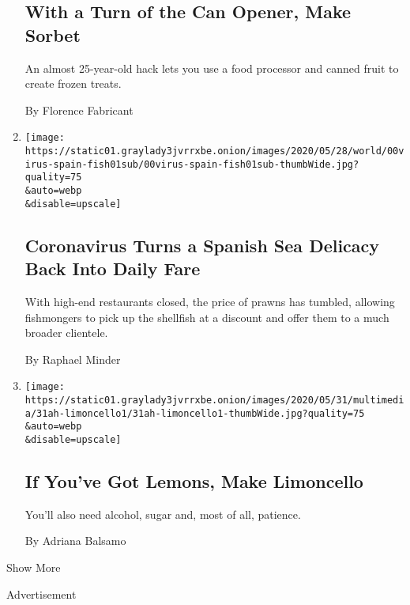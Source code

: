 \begin{enumerate}
  \hypertarget{with-a-turn-of-the-can-opener-make-sorbet}{%
  \subsection{With a Turn of the Can Opener, Make
  Sorbet}\label{with-a-turn-of-the-can-opener-make-sorbet}}

  An almost 25-year-old hack lets you use a food processor and canned
  fruit to create frozen treats.

  By Florence Fabricant
\item
  \href{/2020/05/31/world/europe/coronavirus-prawn-spain.html}{}

  \texttt{[image: https://static01.graylady3jvrrxbe.onion/images/2020/05/28/world/00virus-spain-fish01sub/00virus-spain-fish01sub-thumbWide.jpg?quality=75\\\&auto=webp\\\&disable=upscale]}

  \hypertarget{coronavirus-turns-a-spanish-sea-delicacy-back-into-daily-fare}{%
  \subsection{Coronavirus Turns a Spanish Sea Delicacy Back Into Daily
  Fare}\label{coronavirus-turns-a-spanish-sea-delicacy-back-into-daily-fare}}

  With high-end restaurants closed, the price of prawns has tumbled,
  allowing fishmongers to pick up the shellfish at a discount and offer
  them to a much broader clientele.

  By Raphael Minder
\item
  \href{/2020/05/29/at-home/coronavirus-how-to-make-limoncello.html}{}

  \texttt{[image: https://static01.graylady3jvrrxbe.onion/images/2020/05/31/multimedia/31ah-limoncello1/31ah-limoncello1-thumbWide.jpg?quality=75\\\&auto=webp\\\&disable=upscale]}

  \hypertarget{if-youve-got-lemons-make-limoncello}{%
  \subsection{If You've Got Lemons, Make
  Limoncello}\label{if-youve-got-lemons-make-limoncello}}

  You'll also need alcohol, sugar and, most of all, patience.

  By Adriana Balsamo
\end{enumerate}

Show More

Advertisement

